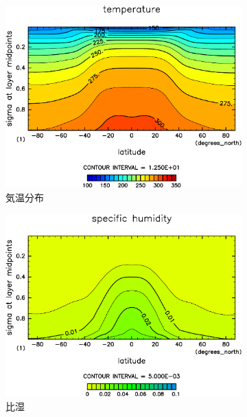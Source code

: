 \documentclass[body]{subfiles}
\begin{document}
\begin{figure}[t]
\begin{subfigure}{.4\textwidth}
		\includegraphics[width=\columnwidth]{S1600/Temp,time=3650:4015-crop-rotate.pdf}
		\caption{気温分布}
	\end{subfigure}
	\begin{subfigure}{.4\textwidth}
		\centering
		\includegraphics[width=\columnwidth]{S1600/QH2OVap,time=3650:4015-crop-rotate.pdf}
		\caption{比湿}
	\end{subfigure}
	\begin{subfigure}{.4\textwidth}
		\centering

\end{subfigure}
\end{figure}
\end{document}
